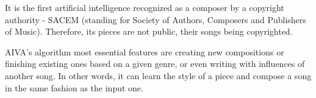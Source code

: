 It is the first artificial intelligence recognized as a composer by a copyright authority -
SACEM (standing for Society of Authors, Composers and Publishers of Music).
Therefore, its pieces are not public, their songs being copyrighted. \cite{aiva2}

AIVA's algorithm most essential features are creating new compositions or
finishing existing ones based on a given genre, or even writing with influences of another song.
In other words, it can learn the style of a piece and compose a song
in the same fashion as the input one.\cite{aiva1}
